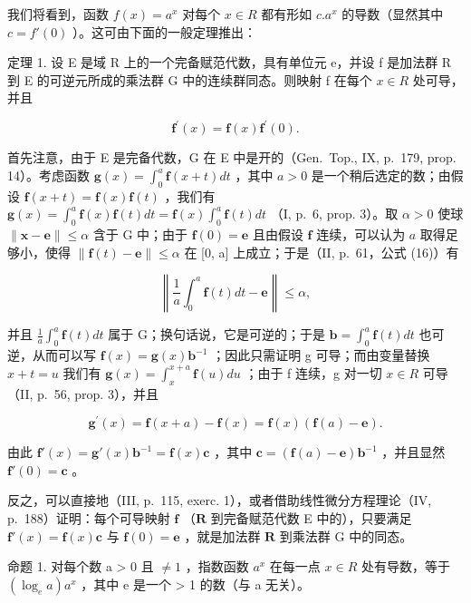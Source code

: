 我们将看到，函数 \(f(x) = a^{x}\) 对每个 \(x \in R\) 都有形如 \(c.a^{x}\) 的导数（显然其中 \(c = f'(0)\) ）。这可由下面的一般定理推出：

定理 1. 设 E 是域 R 上的一个完备赋范代数，具有单位元 e，并设 f 是加法群 R 到 E 的可逆元所成的乘法群 G 中的连续群同态。则映射 f 在每个 \(x \in R\) 处可导，并且

\[
\mathbf {f} ^ {\prime} (x) = \mathbf {f} (x) \mathbf {f} ^ {\prime} (0).\tag{1}
\]

首先注意，由于 E 是完备代数，G 在 E 中是开的（Gen.~Top., IX, p.~179, prop. 14）。考虑函数 \(\mathbf{g}(x) = \int_0^a \mathbf{f}(x + t) dt\) ，其中 \(a > 0\) 是一个稍后选定的数；由假设 \(\mathbf{f}(x + t) = \mathbf{f}(x) \mathbf{f}(t)\) ，我们有 \(\mathbf{g}(x) = \int_0^a \mathbf{f}(x) \mathbf{f}(t) dt = \mathbf{f}(x) \int_0^a \mathbf{f}(t) dt\) （I, p.~6, prop. 3）。取 \(\alpha > 0\) 使球 \(\| \mathbf{x} - \mathbf{e} \| \leqslant \alpha\) 含于 G 中；由于 \(\mathbf{f}(0) = \mathbf{e}\) 且由假设 \(\mathbf{f}\) 连续，可以认为 \(a\) 取得足够小，使得 \(\| \mathbf{f}(t) - \mathbf{e} \| \leqslant \alpha\) 在 {[}0, a{]} 上成立；于是（II, p.~61，公式 (16)）有

\[
\left\| \frac {1}{a} \int_ {0} ^ {a} \mathbf {f} (t) d t - \mathbf {e} \right\| \leqslant \alpha ,
\]

并且 \(\frac{1}{a}\int_{0}^{a}\mathbf{f}(t)dt\) 属于 G；换句话说，它是可逆的；于是 \(\mathbf{b}=\int_{0}^{a}\mathbf{f}(t)dt\) 也可逆，从而可以写 \(\mathbf{f}(x)=\mathbf{g}(x)\mathbf{b}^{-1}\) ；因此只需证明 g 可导；而由变量替换 \(x+t=u\) 我们有 \(\mathbf{g}(x)=\int_{x}^{x+a}\mathbf{f}(u)du\) ；由于 f 连续，g 对一切 \(x\in R\) 可导（II, p.~56, prop. 3），并且

\[
\mathbf {g} ^ {\prime} (x) = \mathbf {f} (x + a) - \mathbf {f} (x) = \mathbf {f} (x) (\mathbf {f} (a) - \mathbf {e}).
\]

由此 \(\mathbf{f}'(x) = \mathbf{g}'(x)\mathbf{b}^{-1} = \mathbf{f}(x)\mathbf{c}\) ，其中 \(\mathbf{c} = (\mathbf{f}(a) - \mathbf{e})\mathbf{b}^{-1}\) ，并且显然 \(\mathbf{f}'(0) = \mathbf{c}\) 。

反之，可以直接地（III, p.~115, exerc. 1），或者借助线性微分方程理论（IV, p.~188）证明：每个可导映射 \(\mathbf{f}\) （\(\mathbf{R}\) 到完备赋范代数 E 中的），只要满足 \(\mathbf{f}'(x) = \mathbf{f}(x)\mathbf{c}\) 与 \(\mathbf{f}(0) = \mathbf{e}\) ，就是加法群 \(\mathbf{R}\) 到乘法群 G 中的同态。

命题 1. 对每个数 a \textgreater{} 0 且 \(\neq 1\) ，指数函数 \(a^{x}\) 在每一点 \(x \in R\) 处有导数，等于 \((\log_{e}a)a^{x}\) ，其中 e 是一个 \textgreater{} 1 的数（与 a 无关）。

